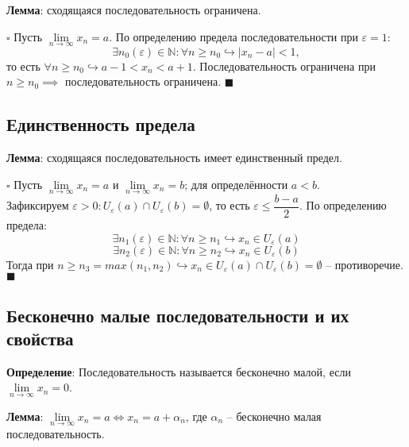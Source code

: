 \documentclass[12pt, a4paper, reqno]{article}
\begin{document}
    \textbf{Лемма}: сходящаяся последовательность ограничена.

    $\square$ Пусть $\lim\limits_{n\to\infty} x_n = a$. По определению предела последовательности
    при $\varepsilon = 1$:
    \begin{equation*}
    \exists n_0(\varepsilon)\in\mathbb{N}: \forall n \geq n_0 \hookrightarrow |x_n - a| < 1,
    \end{equation*}
    то есть $\forall n \geq n_0 \hookrightarrow a - 1 < x_n < a + 1$. Последовательность ограничена
    при $n \geq n_0 \implies$ последовательность ограничена. $\blacksquare$

\subsection{Единственность предела}

    \textbf{Лемма}: сходящаяся последовательность имеет единственный предел.

    $\square$ Пусть $\lim\limits_{n\to\infty} x_n = a$ и $\lim\limits_{n\to\infty} x_n = b$; для
    определённости $a < b$.\\
    Зафиксируем $\varepsilon > 0: U_{\varepsilon}(a)\cap U_{\varepsilon}(b) = \emptyset$, то есть
    $\varepsilon \leq \dfrac{b - a}{2}$. По определению предела:\\
    \begin{equation*}
        \exists n_1(\varepsilon)\in\mathbb{N}: \forall n\geq n_1 \hookrightarrow x_n\in U_{\varepsilon}(a)
    \end{equation*}
    \begin{equation*}
        \exists n_2(\varepsilon)\in\mathbb{N}: \forall n\geq n_2 \hookrightarrow x_n\in U_{\varepsilon}(b)
    \end{equation*}
    Тогда при $n \geq n_3 = max(n_1, n_2) \hookrightarrow x_n\in U_{\varepsilon}(a)\cap
    U_{\varepsilon}(b) = \emptyset$ -- противоречие. $\blacksquare$

\subsection{Бесконечно малые последовательности и их свойства}

    \textbf{Определение}: Последовательность называется бесконечно малой, если
    $\lim\limits_{n\to\infty} x_n = 0$.

    \textbf{Лемма}: $\lim\limits_{n\to\infty} x_n = a \iff x_n = a + \alpha_n$, где $\alpha_n$ --
    бесконечно малая последовательность.
\end{document}
